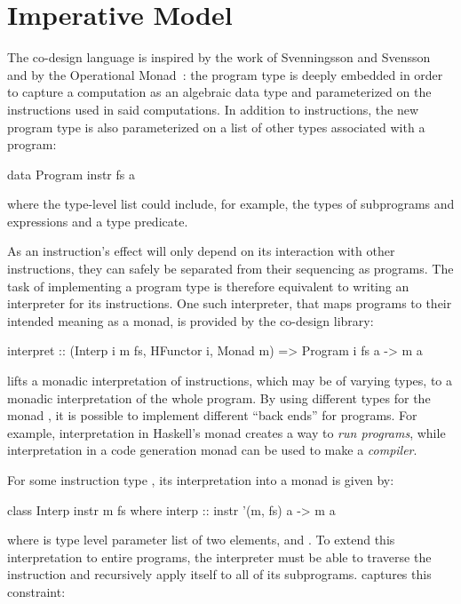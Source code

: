 \documentclass[../paper.tex]{subfiles}
\begin{document}
\section{Imperative Model}
\label{instr}

The co-design language is inspired by the work of Svenningsson and Svensson~\cite{BjornBenny} and by the Operational Monad~\cite{Operational}: the program type is deeply embedded in order to capture a computation as an algebraic data type and parameterized on the instructions used in said computations. In addition to instructions, the new program type is also parameterized on a list of other types associated with a program:

\begin{code}
data Program instr fs a
\end{code}

\noindent where the type-level list  could include, for example, the types of subprograms and expressions and a type predicate.

As an instruction's effect will only depend on its interaction with other instructions, they can safely be separated from their sequencing as programs. The task of implementing a program type is therefore equivalent to writing an interpreter for its instructions. One such interpreter, that maps programs to their intended meaning as a monad, is provided by the co-design library:

\begin{code}
interpret :: (Interp i m fs, HFunctor i, Monad m) => Program i fs a -> m a
\end{code}

 lifts a monadic interpretation of instructions, which may be of varying types, to a monadic interpretation of the whole program. By using different types for the monad , it is possible to implement different ``back ends'' for programs. For example, interpretation in Haskell's  monad creates a way to \emph{run programs}, while interpretation in a code generation monad can be used to make a \emph{compiler}.

For some instruction type , its interpretation into a monad  is given by:

\begin{code}
class Interp instr m fs where
  interp :: instr '(m, fs) a -> m a
\end{code}

\noindent where  is type level parameter list of two elements,  and . To extend this interpretation to entire programs, the interpreter must be able to traverse the instruction and recursively apply itself to all of its subprograms.  captures this constraint:
\end{document}
